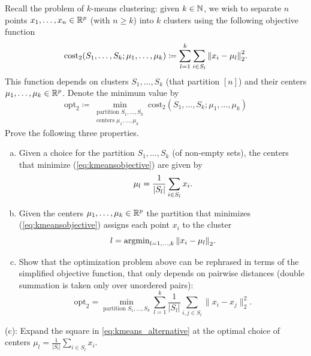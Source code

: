 \begin{myexercise}\label{prob:lloyd_monotonicity}
    Recall the problem of $k$-means clustering: given $k \in \mathbb{N}$, we wish to separate $n$ points $x_1, \ldots, x_n \in \mathbb{R}^p$ (with $n \geq k$) into $k$ clusters using the following objective function
    \begin{equation}\label{eq:kmeansobjective}
        \text{cost}_2(S_1, \ldots, S_k; \mu_1, \ldots, \mu_k) \coloneqq \sum_{l=1}^k \sum_{i \in S_l} {\left\lVert{x_i - \mu_l}\right\rVert}_2^2.
    \end{equation}
    This function depends on clusters $S_1, \ldots, S_k$ (that partition $[n]$) and their centers $\mu_1, \ldots, \mu_k \in \mathbb{R}^p$. Denote the minimum value by
    \begin{equation*}
        \text{opt}_2 \coloneqq \min_{\substack{\text{partition }S_1,\ldots,S_k\\\text{centers }\mu_1, \ldots, \mu_k}} \text{cost}_2(S_1, \ldots, S_k; \mu_1, \ldots, \mu_k)
    \end{equation*}
    Prove the following three properties.
    \begin{enumerate}[(a)]
        \item Given a choice for the partition $S_1, \ldots, S_k$ (of non-empty sets), the centers that minimize (\ref{eq:kmeansobjective}) are given by
        \begin{equation*}
            \mu_l = \frac{1}{|S_l|}\sum_{i \in S_l}x_i.
        \end{equation*}
        
        \item Given the centers $\mu_1, \ldots, \mu_k \in \mathbb{R}^p$ the partition that minimizes (\ref{eq:kmeansobjective}) assigns each point $x_i$ to the cluster
        \begin{equation*}
            l = \operatorname{argmin}_{l=1, \ldots, k}{\left\lVert{x_i-\mu_l}\right\rVert}_2.
        \end{equation*}

        \item Show that the optimization problem above can be rephrased in terms of the simplified objective function, that only depends on pairwise distances (double summation is taken only over unordered pairs):
        \begin{equation}\label{eq:kmeans_alternative}
            \text{opt}_2 = \min_{\text{partition }S_1,\ldots,S_k}
            \sum_{l=1}^k \frac{1}{|S_l|}\sum_{i,j \in S_l}\|x_i-x_j\|_2^2.
        \end{equation}
    \end{enumerate}
\end{myexercise}
\begin{hint}
    (c): Expand the square in \eqref{eq:kmeans_alternative} at the optimal choice of centers $\mu_l = \frac{1}{|S_l|}\sum_{i\in S_l} x_i$.
\end{hint}


